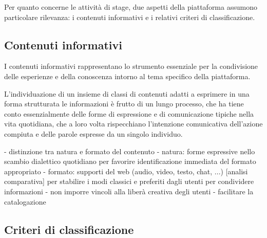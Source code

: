 Per quanto concerne le attività di stage, due aspetti della piattaforma assumono particolare rilevanza: i contenuti informativi e i relativi criteri di classificazione.

\subsection{Contenuti informativi}
\label{sec:progetto:contenuti}
I contenuti informativi rappresentano lo strumento essenziale per la condivisione delle esperienze e della conoscenza intorno al tema specifico della piattaforma.

L'individuazione di un insieme di classi di contenuti adatti a esprimere in una forma strutturata le informazioni è frutto di un lungo processo, che ha  tiene conto essenzialmente delle forme di espressione e di comunicazione tipiche nella vita quotidiana, che a loro volta rispecchiano l'intenzione comunicativa dell'azione compiuta e delle parole espresse da un singolo individuo.

- distinzione tra natura e formato del contenuto
	- natura: forme espressive nello scambio dialettico quotidiano per favorire identificazione immediata del formato appropriato
	- formato: supporti del web (audio, video, testo, chat, ...) [analisi comparativa] per stabilire i modi classici e preferiti dagli utenti per condividere informazioni
- non imporre vincoli alla liberà creativa degli utenti
- facilitare la catalogazione


\subsection{Criteri di classificazione}
\label{sec:progetto:classificazione}
